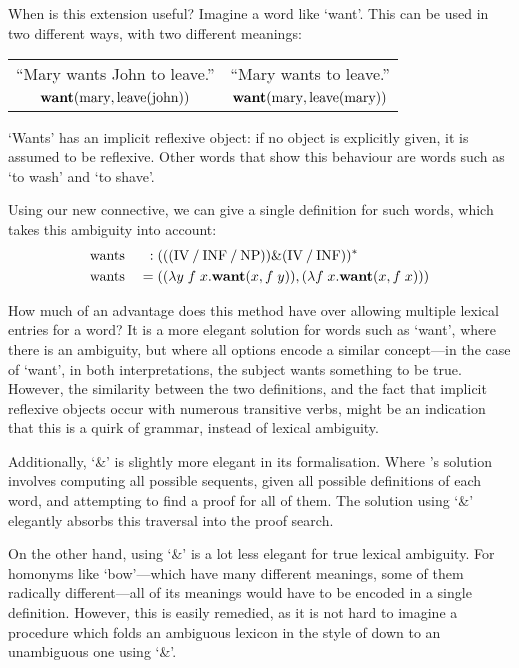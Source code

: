 When is this extension useful? Imagine a word like `want'. This can be
used in two different ways, with two different meanings:\\
\begin{center}
  \vspace{-1\baselineskip}
  \renewcommand{\arraystretch}{1}
  \begin{tabular}{c c}
    ``Mary wants John to leave.'' & ``Mary wants to leave.''\\
    $\WANT(\mary,\leave(\john))$  & $\WANT(\mary,\leave(\mary))$
  \end{tabular}
\end{center}
`Wants' has an implicit reflexive object: if no object is explicitly
given, it is assumed to be reflexive. Other words that show this
behaviour are words such as `to wash' and `to shave'.

Using our new connective, we can give a single definition for such
words, which takes this ambiguity into account:
\begin{alignat*}{3}
  &\wants\;&:\;&\tr[(((\IV\impl\INF\impl\NP))\&(\IV\impl\INF))]\\
  &\wants\;&=\;&((\lambda y\;f\;x.\WANT(x,f\;y)),(\lambda f\;x.\WANT(x,f\;x)))
\end{alignat*}

How much of an advantage does this method have over allowing multiple
lexical entries for a word? It is a more elegant solution for words
such as `want', where there is an ambiguity, but where all options
encode a similar concept---in the case of `want', in both
interpretations, the subject wants something to be true.
However, the similarity between the two definitions, and the
fact that implicit reflexive objects occur with numerous transitive
verbs, might be an indication that this is a quirk of grammar, instead
of lexical ambiguity.

Additionally, `\&' is slightly more elegant in its formalisation.
Where \citeauthor{lambek1958}'s solution involves computing all
possible sequents, given all possible definitions of each word, and
attempting to find a proof for all of them. The solution using `\&'
elegantly absorbs this traversal into the proof search.

On the other hand, using `\&' is a lot less elegant for true lexical
ambiguity. For homonyms like `bow'---which have many different
meanings, some of them radically different---all of its meanings would
have to be encoded in a single definition. However, this is easily
remedied, as it is not hard to imagine a procedure which folds an
ambiguous lexicon in the style of \citeauthor{lambek1958} down to an
unambiguous one using `\&'.
